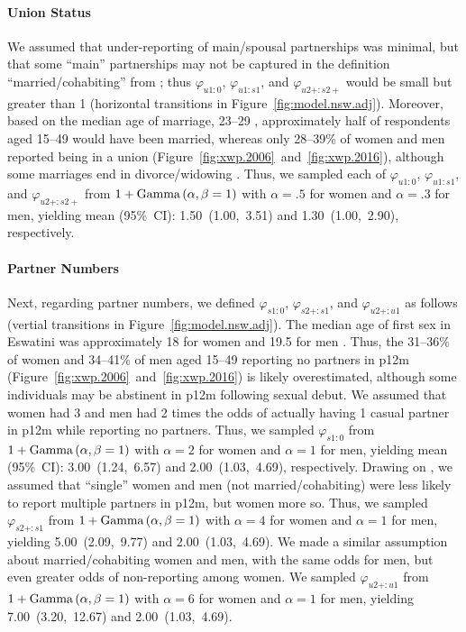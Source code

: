 \paragraph{Union Status}
We assumed that under-reporting of main/spousal partnerships was minimal,
but that some ``main'' partnerships may not be captured in
the definition ``married/cohabiting'' from \cite{SDHS2006,SHIMS2};
thus $\varphi_{u1:0}$, $\varphi_{u1:s1}$, and $\varphi_{u2+:s2+}$
would be small but greater than 1
(horizontal transitions in Figure~\ref{fig:model.nsw.adj}).
Moreover, based on the median age of marriage, 23--29 \cite{SDHS2006},
approximately half of respondents aged 15--49 would have been married,
whereas only 28--39\% of women and men reported being in a union
(Figure~\ref{fig:xwp.2006}~and~\ref{fig:xwp.2016}),
although some marriages end in divorce/widowing \cite{SDHS2006}.
Thus, we sampled each of $\varphi_{u1:0}$, $\varphi_{u1:s1}$, and $\varphi_{u2+:s2+}$
from $1+\textnormal{Gamma}\,(\alpha,\beta=1)$
with $\alpha=.5$ for women and $\alpha=.3$ for men,
yielding mean (95\%~CI): 1.50~(1.00,~3.51) and 1.30~(1.00,~2.90), respectively.
\paragraph{Partner Numbers}
Next, regarding partner numbers,
we defined $\varphi_{s1:0}$, $\varphi_{s2+:s1}$, and $\varphi_{u2+:u1}$ as follows
(vertial transitions in Figure~\ref{fig:model.nsw.adj}).
The median age of first sex in Eswatini was
approximately 18 for women and 19.5 for men \cite{SDHS2006}.
Thus, the 31--36\% of women and 34--41\% of men aged 15--49 reporting no partners in p12m
(Figure~\ref{fig:xwp.2006}~and~\ref{fig:xwp.2016}) is likely overestimated,
although some individuals may be abstinent in p12m following sexual debut.
We assumed that women had 3 and men had 2 times the odds of
actually having 1 casual partner in p12m while reporting no partners.
Thus, we sampled $\varphi_{s1:0}$ from $1+\textnormal{Gamma}\,(\alpha,\beta=1)$
with $\alpha=2$ for women and $\alpha=1$ for men,
yielding mean (95\%~CI): 3.00~(1.24,~6.57) and 2.00~(1.03,~4.69), respectively.
Drawing on \cite{Behanzin2013}, we assumed that ``single'' women and men (not married/cohabiting)
were less likely to report multiple partners in p12m, but women more so.
Thus, we sampled $\varphi_{s2+:s1}$ from $1+\textnormal{Gamma}\,(\alpha,\beta=1)$
with $\alpha=4$ for women and $\alpha=1$ for men,
yielding 5.00~(2.09,~9.77) and 2.00~(1.03,~4.69).
We made a similar assumption about married/cohabiting women and men,
with the same odds for men, but even greater odds of non-reporting among women.
We sampled $\varphi_{u2+:u1}$ from $1+\textnormal{Gamma}\,(\alpha,\beta=1)$
with $\alpha=6$ for women and $\alpha=1$ for men,
yielding 7.00~(3.20,~12.67) and 2.00~(1.03,~4.69).
